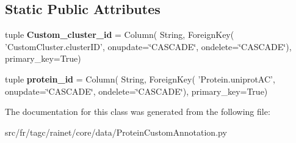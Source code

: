 \subsection*{Static Public Attributes}
\begin{DoxyCompactItemize}
\item 
\hypertarget{classsrc_1_1fr_1_1tagc_1_1rainet_1_1core_1_1data_1_1ProteinCustomAnnotation_1_1ProteinCustomAnnotation_a37331152fc3097a58296704122be27a7}{tuple {\bfseries Custom\-\_\-cluster\-\_\-id} = Column( String, Foreign\-Key( 'Custom\-Cluster.\-cluster\-I\-D', onupdate=\char`\"{}C\-A\-S\-C\-A\-D\-E\char`\"{}, ondelete=\char`\"{}C\-A\-S\-C\-A\-D\-E\char`\"{}), primary\-\_\-key=True)}\label{classsrc_1_1fr_1_1tagc_1_1rainet_1_1core_1_1data_1_1ProteinCustomAnnotation_1_1ProteinCustomAnnotation_a37331152fc3097a58296704122be27a7}

\item 
\hypertarget{classsrc_1_1fr_1_1tagc_1_1rainet_1_1core_1_1data_1_1ProteinCustomAnnotation_1_1ProteinCustomAnnotation_aed45f13a9cb760e3e4c087f235054a80}{tuple {\bfseries protein\-\_\-id} = Column( String, Foreign\-Key( 'Protein.\-uniprot\-A\-C', onupdate=\char`\"{}C\-A\-S\-C\-A\-D\-E\char`\"{}, ondelete=\char`\"{}C\-A\-S\-C\-A\-D\-E\char`\"{}), primary\-\_\-key=True)}\label{classsrc_1_1fr_1_1tagc_1_1rainet_1_1core_1_1data_1_1ProteinCustomAnnotation_1_1ProteinCustomAnnotation_aed45f13a9cb760e3e4c087f235054a80}

\end{DoxyCompactItemize}


The documentation for this class was generated from the following file\-:\begin{DoxyCompactItemize}
\item 
src/fr/tagc/rainet/core/data/Protein\-Custom\-Annotation.\-py\end{DoxyCompactItemize}
